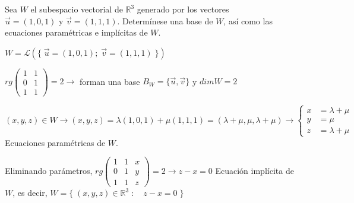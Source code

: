\begin{ejre}
	Sea $W$ el subespacio vectorial de $\mathbb R^3$ generado por los vectores $\vec u=(1,0,1) \text{ y } \vec v=(1,1,1)$. Determínese una base de $W$, así como las ecuaciones paramétricas e implícitas de $W$.
\end{ejre}
\begin{proofw}\renewcommand{\qedsymbol}{$\diamond$}
	$W=\mathcal L \left( \{\; \vec u=(1,0,1); \; \vec v=(1,1,1) \; \} \right)$
	
\noindent $rg \left( \begin{matrix} 1&1\\0&1\\1&1 \end{matrix} \right)=2 \to $ forman una base $B_W=\{\vec u, \vec v\}$ y  $dim W=2$

\noindent $(x,y,z)\in W \to (x,y,z)=\lambda (1,0,1)+\mu (1,1,1)=(\lambda+\mu, \mu, \lambda+\mu) \to \begin{cases} x&=\lambda+\mu \\y&=\mu\\ z&= \lambda+\mu \end{cases}$ Ecuaciones paramétricas de $W$.

\noindent Eliminando parámetros, $rg \left( \begin{matrix} 1&1&x\\0&1&y\\1&1&z \end{matrix} \right)=2 \to z-x=0$ Ecuación implícita de $W$, es decir, $W=\{\; (x,y,z)\in \mathbb R^3\; : \quad z-x=0 \; \}$

\end{proofw}


